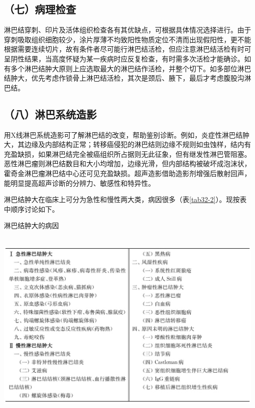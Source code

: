 \subsection{（七）病理检查}

淋巴结穿刺、印片及活体组织检查各有其优缺点，可根据具体情况选择进行。由于穿刺吸取组织细胞较少，涂片厚薄不均致阳性物质定位不清而出现假阳性，更不能根据需要连续切片，故有条件者尽可能行淋巴结活检，但应注意淋巴结活检有时可呈阴性结果，当高度怀疑为某一疾病时应反复检查，有时需多次活检才能确诊。如有多个淋巴结肿大原则上应选取最大的淋巴结作活检，并整个切下。如多部位淋巴结肿大，优先考虑作锁骨上淋巴结活检，其次是颈后、腋下，最后才考虑腹股沟淋巴结。

\subsection{（八）淋巴系统造影}

用X线淋巴系统造影可了解淋巴结的改变，帮助鉴别诊断。例如，炎症性淋巴结肿大，其边缘及内部结构正常；转移癌侵犯的淋巴结则边缘不规则如虫蚀样，结内有充盈缺损，如果淋巴结完全被癌组织所占据则无此征象，但有继发性淋巴管阻塞。恶性淋巴瘤则淋巴结数目和大小均增加，边缘光滑，但内部结构被破坏成泡沫状，霍奇金淋巴瘤淋巴结中心还可见充盈缺损。超声造影借助造影剂增强后散射回声，能明显提高超声诊断的分辨力、敏感性和特异性。

淋巴结肿大在临床上可分为急性和慢性两大类，病因很多（表\ref{tab32-2}）。现按表中顺序讨论如下。

\begin{table}[htbp]
\centering
\caption{淋巴结肿大的病因}
\label{tab32-2}
\includegraphics[width=5.89583in,height=3.72917in]{./images/Image00162.jpg}
\end{table}

